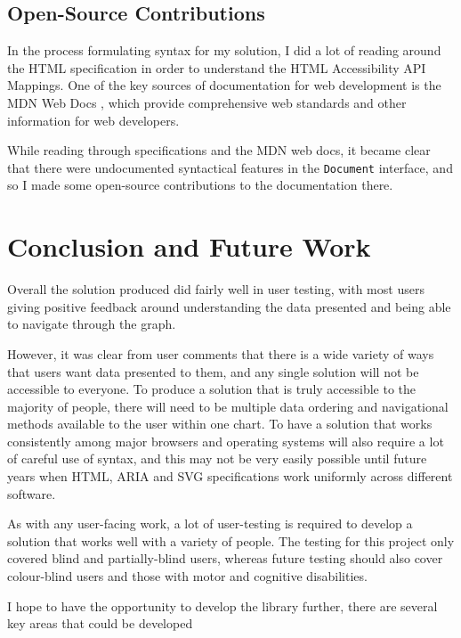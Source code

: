 \documentclass[ %
                    author={Aleena Baig},
                supervisor={Dr Simon Lock},
                    degree={BSc},
                     title={On Making Web Accessible Graphs},
                  subtitle={},
                      year={2019} ]{dissertation}
\begin{document}
\section{Open-Source Contributions}

In the process formulating syntax for my solution, I did a lot of reading around the HTML specification \cite{htmlspec} in order to understand the HTML Accessibility API Mappings. One of the key sources of documentation for web development is the MDN Web Docs \cite{mdndocs}, which provide comprehensive web standards and other information for web developers.

While reading through specifications and the MDN web docs, it became clear that there were undocumented syntactical features in the \texttt{Document} interface, and so I made some open-source contributions to the documentation there.


\chapter{Conclusion and Future Work}

Overall the solution produced did fairly well in user testing, with most users giving positive feedback around understanding the data presented and being able to navigate through the graph.

However, it was clear from user comments that there is a wide variety of ways that users want data presented to them, and any single solution will not be accessible to everyone. To produce a solution that is truly accessible to the majority of people, there will need to be multiple data ordering and navigational methods available to the user within one chart. To have a solution that works consistently among major browsers and operating systems will also require a lot of careful use of syntax, and this may not be very easily possible until future years when HTML, ARIA and SVG specifications work uniformly across different software.

As with any user-facing work, a lot of user-testing is required to develop a solution that works well with a variety of people. The testing for this project only covered blind and partially-blind users, whereas future testing should also cover colour-blind users and those with motor and cognitive disabilities.

I hope to have the opportunity to develop the library further, there are several key areas that could be developed
\end{document}
